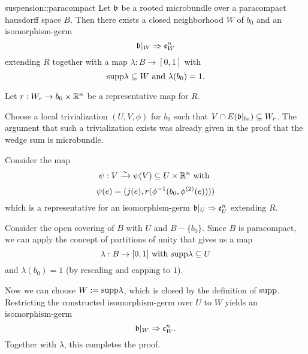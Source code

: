 \begin{mylemma}{suspension::paracompact}
    Let $\mathfrak{b}$ be a rooted microbundle over a paracompact hausdorff space $B$.
    Then there exists a closed neighborhood $W$ of $b_0$ and an isomorphism-germ
    \[ \mathfrak{b}\vert_{W} \Rightarrow{} \mathfrak{e}^{n}_{W} \]
    extending $R$ together with a map $\lambda: B \to [0, 1]$ with
    \[ \text{supp}{\lambda} \subseteq{} W \text{ and } \lambda(b_0) = 1. \]
\end{mylemma}

\begin{myproof}
    Let $r: W_r \to b_0 \times \mathbb{R}^n$ be a representative map for $R$.
    
    Choose a local trivialization $(U, V, \phi)$ for $b_0$ such that $V \cap E(\mathfrak{b}\vert_{b_0}) \subseteq{} W_r$.
    The argument that such a trivialization exists was already given
    in the proof that the wedge sum is microbundle.

    Consider the map
    \[ \psi: V \xrightarrow{\sim} \psi(V) \subseteq{} U \times \mathbb{R}^n \text{ with } \]
    \[ \psi(e) = (j(e), r(\phi^{-1}(b_0, \phi^{(2)}(e)))) \]
    which is a representative for an isomorphism-germ $\mathfrak{b}\vert_{U} \Rightarrow{} \mathfrak{e}^{n}_{U}$ extending $R$.
    
    Consider the open covering of $B$ with $U$ and $B - \{b_0\}$.
    Since $B$ is paracompact, we can apply the concept
    of partitions of unity that gives us a map
    \[ \lambda: B \to [0, 1] \text{ with } \text{supp}{\lambda} \subseteq{} U \]
    and $\lambda(b_0) = 1$ (by rescaling and capping to $1$).

    Now we can choose $W := \text{supp}{\lambda}$, which is closed by the definition of $\text{supp}$.
    Restricting the constructed isomorphism-germ over $U$ to $W$
    yields an isomorphism-germ
    \[ \mathfrak{b}\vert_{W} \Rightarrow{} \mathfrak{e}^{n}_{W}. \]
    Together with $\lambda$, this completes the proof.
\end{myproof}